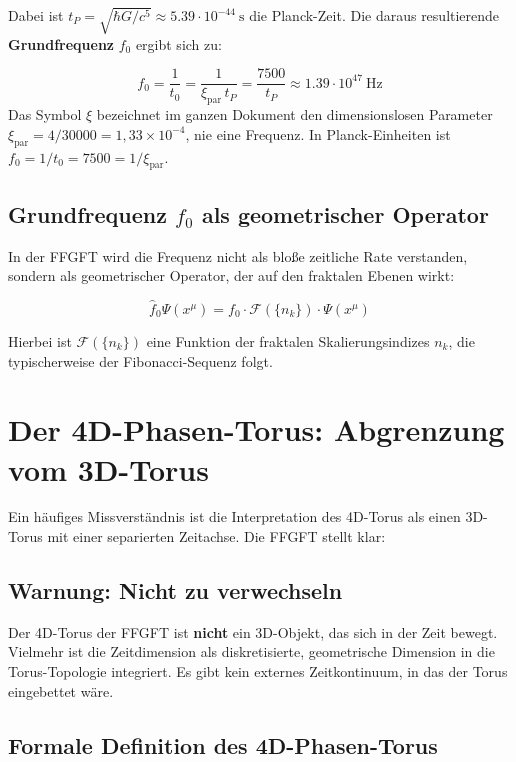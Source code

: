 	Dabei ist $t_P = \sqrt{\hbar G/c^5} \approx 5.39 \cdot 10^{-44}~\text{s}$ die Planck-Zeit. Die daraus resultierende \textbf{Grundfrequenz} $f_0$ ergibt sich zu:
	
	\begin{equation}
		f_0 = \frac{1}{t_0} = \frac{1}{\xi_{\text{par}}\, t_P} = \frac{7500}{t_P} \approx 1.39 \cdot 10^{47}~\text{Hz}
	\end{equation}
	Das Symbol $\xi$ bezeichnet im ganzen Dokument den dimensionslosen Parameter $\xi_{\text{par}} = 4/30000 = 1{,}33\times 10^{-4}$, nie eine Frequenz. In Planck-Einheiten ist $f_0 = 1/t_0 = 7500 = 1/\xi_{\text{par}}$.
	
	\subsection{Grundfrequenz $f_0$ als geometrischer Operator}
	
	In der FFGFT wird die Frequenz nicht als bloße zeitliche Rate verstanden, sondern als geometrischer Operator, der auf den fraktalen Ebenen wirkt:
	
	\begin{equation}
		\hat{f}_0 \Psi(x^\mu) = f_0 \cdot \mathcal{F}(\{n_k\}) \cdot \Psi(x^\mu)
	\end{equation}
	
	Hierbei ist $\mathcal{F}(\{n_k\})$ eine Funktion der fraktalen Skalierungsindizes $n_k$, die typischerweise der Fibonacci-Sequenz folgt.
	
	\section{Der 4D-Phasen-Torus: Abgrenzung vom 3D-Torus}
	
	Ein häufiges Missverständnis ist die Interpretation des 4D-Torus als einen 3D-Torus mit einer separierten Zeitachse. Die FFGFT stellt klar:
	
	\subsection{Warnung: Nicht zu verwechseln}
	
	Der 4D-Torus der FFGFT ist \textbf{nicht} ein 3D-Objekt, das sich in der Zeit bewegt. Vielmehr ist die Zeitdimension als diskretisierte, geometrische Dimension in die Torus-Topologie integriert. Es gibt kein externes Zeitkontinuum, in das der Torus eingebettet wäre.
	
	\subsection{Formale Definition des 4D-Phasen-Torus}
	
